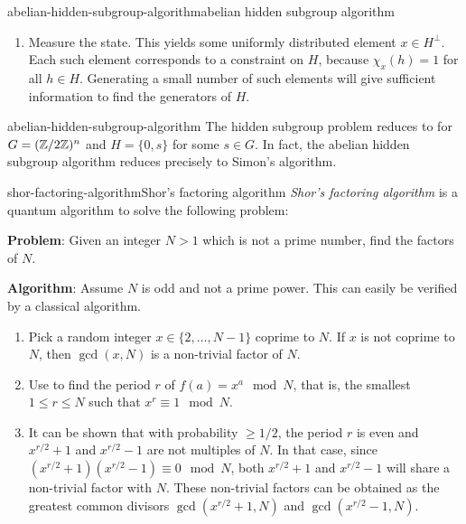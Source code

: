 \begin{topic}{abelian-hidden-subgroup-algorithm}{abelian hidden subgroup algorithm}
\begin{enumerate}[label=(\arabic*)]
\[\begin{aligned}
                = \frac{1}{\sqrt{|H| |G|}} \sum_{x \in G} \chi_g(x) \sum_{h \in H} \chi_h(x) \ket{x}
                = \sqrt{\frac{|H|}{|G|}} \sum_{\substack{x \in H^\perp}} \chi_g(x) \ket{x} ,
        \end{aligned} \]
        where $H^\perp = \{ x \in G \mid \chi_x(h) = 1 \textup{ for all } h \in H \}$, and where the last equality can be shown using the \href{/math-definitions/#RT:first-orthogonality-theorem}{first orthogonality theorem}.
        \item Measure the state. This yields some uniformly distributed element $x \in H^\perp$. Each such element corresponds to a constraint on $H$, because $\chi_x(h) = 1$ for all $h \in H$. Generating a small number of such elements will give sufficient information to find the generators of $H$.
    \end{enumerate}
\end{topic}

\begin{example}{abelian-hidden-subgroup-algorithm}
    The hidden subgroup problem reduces to  for $G = (\mathbb{Z} / 2\mathbb{Z})^{n}$ and $H = \{ 0, s \}$ for some $s \in G$. In fact, the abelian hidden subgroup algorithm reduces precisely to Simon's algorithm.
\end{example}

\begin{topic}{shor-factoring-algorithm}{Shor's factoring algorithm}
    \emph{Shor's factoring algorithm} is a quantum algorithm to solve the following problem:

    \textbf{Problem}: Given an integer $N > 1$ which is not a prime number, find the factors of $N$.

    \textbf{Algorithm}: Assume $N$ is odd and not a prime power. This can easily be verified by a classical algorithm.
    \begin{enumerate}[label=(\arabic*)]
        \item Pick a random integer $x \in \{ 2, \ldots, N - 1 \}$ coprime to $N$. If $x$ is not coprime to $N$, then $\gcd(x, N)$ is a non-trivial factor of $N$.
        \item Use  to find the period $r$ of $f(a) = x^a \mod N$, that is, the smallest $1 \le r \le N$ such that $x^r \equiv 1 \mod N$.
        \item It can be shown that with probability $\ge 1 / 2$, the period $r$ is even and $x^{r/2} + 1$ and $x^{r/2} - 1$ are not multiples of $N$. In that case, since $(x^{r/2} + 1) (x^{r/2} - 1) \equiv 0 \mod N$, both $x^{r/2} + 1$ and $x^{r/2} - 1$ will share a non-trivial factor with $N$. These non-trivial factors can be obtained as the greatest common divisors $\gcd(x^{r/2} + 1, N)$ and $\gcd(x^{r/2} - 1, N)$.
    \end{enumerate}
\end{topic}

